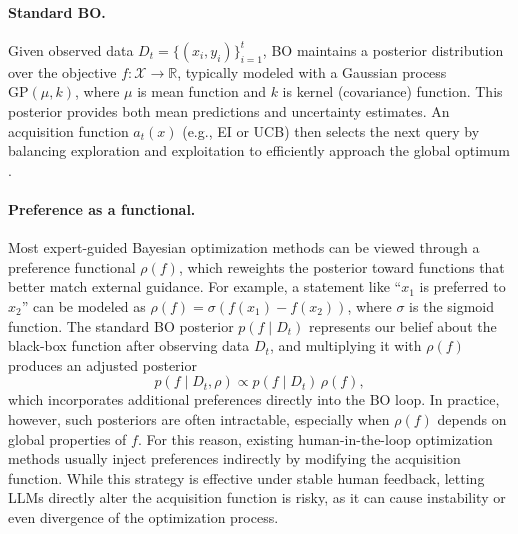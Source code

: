 \documentclass{article} %
\begin{document}
\paragraph{Standard BO.}  

Given observed data $D_t = \{(x_i, y_i)\}_{i=1}^t$, BO maintains a posterior distribution over the objective $f: \mathcal{X} \to \mathbb{R}$, typically modeled with a Gaussian process $\mathrm{GP}(\mu,k)$, where $\mu$ is mean function and $k$ is kernel (covariance) function. This posterior provides both mean predictions and uncertainty estimates. An acquisition function $a_t(x)$ (e.g., EI or UCB) then selects the next query by balancing exploration and exploitation to efficiently approach the global optimum \citep{Shahriari2015BOreview}. 



\paragraph{Preference as a functional.}
Most expert-guided Bayesian optimization methods can be viewed through a preference functional $\rho(f)$, which reweights the posterior toward functions that better match external guidance. For example, a statement like “$x_1$ is preferred to $x_2$” can be modeled as $\rho(f) = \sigma(f(x_1)-f(x_2))$, where $\sigma$ is the sigmoid function. The standard BO posterior $p(f \mid D_t)$ represents our belief about the black-box function after observing data $D_t$, and multiplying it with $\rho(f)$ produces an adjusted posterior
    \[
    p(f \mid D_t, \rho) \propto p(f \mid D_t)\,\rho(f),
    \]
which incorporates additional preferences directly into the BO loop. In practice, however, such posteriors are often intractable, especially when $\rho(f)$ depends on global properties of $f$. For this reason, existing human-in-the-loop optimization methods usually inject preferences indirectly by modifying the acquisition function. While this strategy is effective under stable human feedback, letting LLMs directly alter the acquisition function is risky, as it can cause instability or even divergence of the optimization process.
\end{document}

